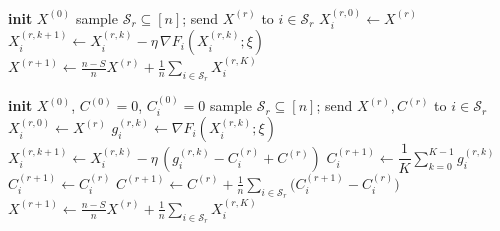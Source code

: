 \documentclass[11pt]{article}
\newcommand{\gF}{\nabla F_i}
\begin{document}
\begin{algorithm}[H]
\caption{FedAvg \cite{fedavg}}
\begin{algorithmic}[1]
\State \textbf{init} $X^{(0)}$
  \State sample $\mathcal{S}_r\subseteq[n]$; send $X^{(r)}$ to $i\in\mathcal{S}_r$
    \State $X_i^{(r,0)}\gets X^{(r)}$
      \State $X_i^{(r,k+1)}\gets X_i^{(r,k)}-\eta\,\gF(X_i^{(r,k)};\xi)$
    \EndFor
  \EndFor
  \State $X^{(r+1)}\gets\tfrac{n-S}{n}X^{(r)}+\tfrac1n\sum_{i\in\mathcal{S}_r}X_i^{(r,K)}$
\EndFor
\end{algorithmic}
\end{algorithm}

\begin{algorithm}[H]
\caption{SCAFFOLD \cite{scaffold}}
\begin{algorithmic}[1]
\State \textbf{init} $X^{(0)}$, $C^{(0)}\!=\!0$, $C_i^{(0)}\!=\!0$
  \State sample $\mathcal{S}_r\subseteq[n]$; send $X^{(r)},C^{(r)}$ to $i\in\mathcal{S}_r$
    \State $X_i^{(r,0)}\gets X^{(r)}$
      \State $g_i^{(r,k)}\gets\gF(X_i^{(r,k)};\xi)$
      \State $X_i^{(r,k+1)}\gets X_i^{(r,k)}-\eta\,(g_i^{(r,k)}-C_i^{(r)}+C^{(r)})$
    \EndFor
    \State $C_i^{(r+1)}\gets\dfrac1K\sum_{k=0}^{K-1}g_i^{(r,k)}$
  \EndFor
    \State $C_i^{(r+1)}\gets C_i^{(r)}$ 
  \EndFor
  \State $C^{(r+1)}\gets C^{(r)}+\tfrac1n\sum_{i\in\mathcal{S}_r}\big(C_i^{(r+1)}-C_i^{(r)}\big)$
  \State $X^{(r+1)}\gets\tfrac{n-S}{n}X^{(r)}+\tfrac1n\sum_{i\in\mathcal{S}_r}X_i^{(r,K)}$
\EndFor
\end{algorithmic}
\end{algorithm}
\end{document}
